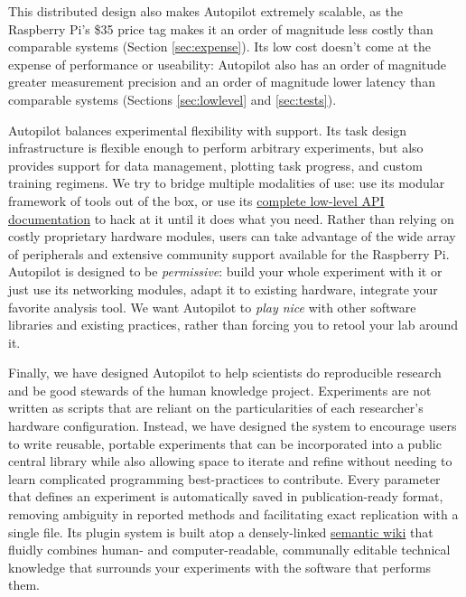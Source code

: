 This distributed design also makes Autopilot extremely scalable, as the Raspberry Pi's \$35 price tag makes it an order of magnitude less costly than comparable systems (Section \ref{sec:expense}). Its low cost doesn't come at the expense of performance or useability: Autopilot also has an order of magnitude greater measurement precision and an order of magnitude lower latency than comparable systems (Sections \ref{sec:lowlevel} and \ref{sec:tests}).

Autopilot balances experimental flexibility with support. Its task design infrastructure is flexible enough to perform arbitrary experiments, but also provides support for data management, plotting task progress, and custom training regimens. We try to bridge multiple modalities of use: use its modular framework of tools out of the box, or use its \href{https://docs.auto-pi-lot.com}{complete low-level API documentation} to hack at it until it does what you need. Rather than relying on costly proprietary hardware modules, users can take advantage of the wide array of peripherals and extensive community support available for the Raspberry Pi. Autopilot is designed to be \textit{permissive}: build your whole experiment with it or just use its networking modules, adapt it to existing hardware, integrate your favorite analysis tool. We want Autopilot to \textit{play nice} with other software libraries and existing practices, rather than forcing you to retool your lab around it.

Finally, we have designed Autopilot to help scientists do reproducible research and be good stewards of the human knowledge project. Experiments are not written as scripts that are reliant on the particularities of each researcher's hardware configuration. Instead, we have designed the system to encourage users to write reusable, portable experiments that can be incorporated into a public central library while also allowing space to iterate and refine without needing to learn complicated programming best-practices to contribute. Every parameter that defines an experiment is automatically saved in  publication-ready format, removing ambiguity in reported methods and facilitating exact replication with a single file. Its plugin system is built atop a densely-linked \href{https://wiki-auto-pi-lot.com}{semantic wiki} that fluidly combines human- and computer-readable, communally editable technical knowledge that surrounds your experiments with the software that performs them.

